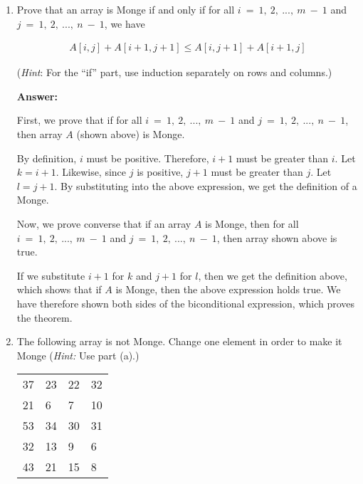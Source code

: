 \documentclass[]{book}
\theoremstyle{definition}
\begin{document}
\begin{enumerate}[label=\alph*.]
    \item Prove that an array is Monge if and only if for all $i~=~1,~2,~...,~m~-~1$
          and $j~=~1,~2,~...,~n~-~1$, we have

    \begin{align*}
        A[i, j] + A[i+1, j+1] \leq A[i, j+1] + A[i+1, j]
    \end{align*}

    (\textit{Hint}: For the ``if'' part, use induction separately on rows and columns.)

    \textbf{Answer:}

    First, we prove that if for all $i~=~1,~2,~...,~m~-~1$
    and $j~=~1,~2,~...,~n~-~1$, then array $A$ (shown above) is Monge.

    By definition, $i$ must be positive. Therefore, $i+1$
    must be greater than $i$. Let $k = i+1$. Likewise, since $j$ is positive, $j+1$
    must be greater than $j$. Let $l = j+1$. By substituting into the above expression,
    we get the definition of a Monge.

    Now, we prove converse that if an array $A$ is Monge, then for all $i~=~1,~2,~...,~m~-~1$
    and $j~=~1,~2,~...,~n~-~1$, then array shown above is true.

    If we substitute
    $i+1$ for $k$ and $j+1$ for $l$, then we get the definition above, which shows that
    if $A$ is Monge, then the above expression holds true. We have therefore shown
    both sides of the biconditional expression, which proves the theorem.

    \item The following array is not Monge. Change one element in order to make it 
          Monge (\textit{Hint:} Use part (a).)

        \begin{table}[H]
        \centering
        \captionsetup{labelfont=it,justification=centering} 		%
        \begin{tabular}{l l l l} %
            37 & 23 & 22 & 32   \tabularnewline
            21 & 6 & 7 & 10     \tabularnewline
            53 & 34 & 30 & 31   \tabularnewline
            32 & 13 & 9 & 6     \tabularnewline
            43 & 21 & 15 & 8    \tabularnewline
        \end{tabular}
        \end{table}


\end{enumerate}
\end{document}
